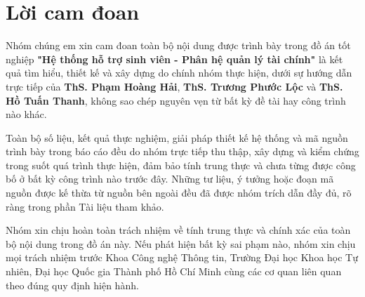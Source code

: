 \chapter*{Lời cam đoan}
\label{ch:commitment}

Nhóm chúng em xin cam đoan toàn bộ nội dung được trình bày trong đồ án tốt nghiệp \textbf{"Hệ thống hỗ trợ sinh viên - Phân hệ quản lý tài chính"} là kết quả tìm hiểu, thiết kế và xây dựng do chính nhóm thực hiện, dưới sự hướng dẫn trực tiếp của \textbf{ThS. Phạm Hoàng Hải}, \textbf{ThS. Trương Phước Lộc} và \textbf{ThS. Hồ Tuấn Thanh}, không sao chép nguyên vẹn từ bất kỳ đề tài hay công trình nào khác.

Toàn bộ số liệu, kết quả thực nghiệm, giải pháp thiết kế hệ thống và mã nguồn trình bày trong báo cáo đều do nhóm trực tiếp thu thập, xây dựng và kiểm chứng trong suốt quá trình thực hiện, đảm bảo tính trung thực và chưa từng được công bố ở bất kỳ công trình nào trước đây. Những tư liệu, ý tưởng hoặc đoạn mã nguồn được kế thừa từ nguồn bên ngoài đều đã được nhóm trích dẫn đầy đủ, rõ ràng trong phần Tài liệu tham khảo.

Nhóm xin chịu hoàn toàn trách nhiệm về tính trung thực và chính xác của toàn bộ nội dung trong đồ án này. Nếu phát hiện bất kỳ sai phạm nào, nhóm xin chịu mọi trách nhiệm trước Khoa Công nghệ Thông tin, Trường Đại học Khoa học Tự nhiên, Đại học Quốc gia Thành phố Hồ Chí Minh cùng các cơ quan liên quan theo đúng quy định hiện hành.

\vspace{1cm}
